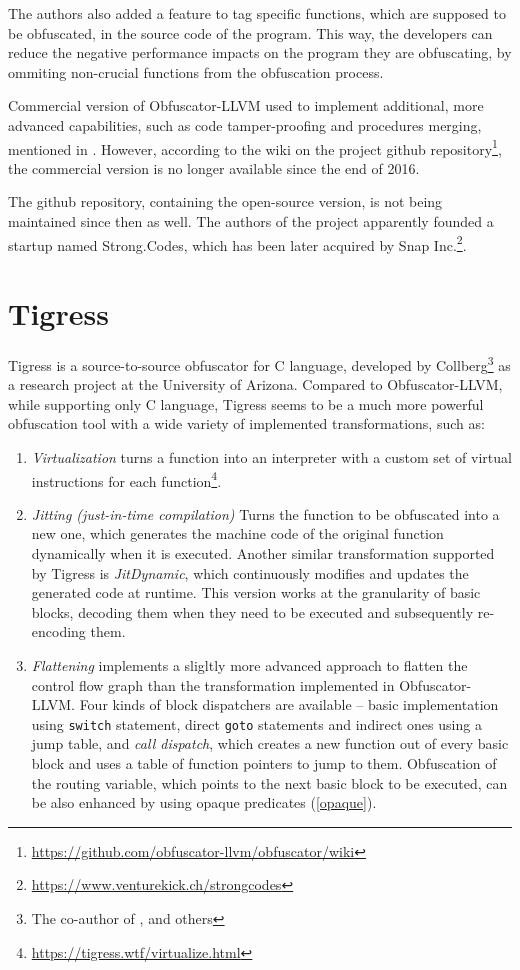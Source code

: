 \documentclass[
  digital, %
  table,   %
  twoside, %
  nolof,     %
  nolot,     %
]{fithesis3}
\theoremstyle{definition}
\begin{document}
The authors also added a feature to tag specific functions, which are supposed to be obfuscated, in the source code of the program. This way, the developers can reduce the negative performance impacts on the program they are obfuscating, by ommiting non-crucial functions from the obfuscation process. 

Commercial version of Obfuscator-LLVM used to implement additional, more advanced capabilities, such as code tamper-proofing and procedures merging, mentioned in \cite{obfuscator-llvm}. However, according to the wiki on the project github repository\footnote{\url{https://github.com/obfuscator-llvm/obfuscator/wiki}}, the commercial version is no longer available since the end of 2016. 

The github repository, containing the open-source version, is not being maintained since then as well. The authors of the project apparently founded a startup named Strong.Codes, which has been later acquired by Snap Inc.\footnote{\url{https://www.venturekick.ch/strongcodes}}.

\section{Tigress}

Tigress is a source-to-source obfuscator for C language, developed by Collberg\footnote{The co-author of \cite{taxonomy_obf}, \cite{manufacturing_opaque} and others} as a research project at the University of Arizona. Compared to Obfuscator-LLVM, while supporting only C language, Tigress seems to be a much more powerful obfuscation tool with a wide variety of implemented transformations, such as:
\begin{enumerate}
    \item \textit{Virtualization} turns a function into an interpreter with a custom set of virtual instructions for each function\footnote{\url{https://tigress.wtf/virtualize.html}}.
    \item \textit{Jitting (just-in-time compilation)} Turns the function to be obfuscated into a new one, which generates the machine code of the original function dynamically when it is executed. Another similar transformation supported by Tigress is \textit{JitDynamic}, which continuously modifies and updates the generated code at runtime. This version works at the granularity of basic blocks, decoding them when they need to be executed and subsequently re-encoding them.
    \item \textit{Flattening} implements a sligltly more advanced approach to flatten the control flow graph than the transformation implemented in Obfuscator-LLVM. Four kinds of block dispatchers are available -- basic implementation using \texttt{switch} statement, direct \texttt{goto} statements and indirect ones using a jump table, and \textit{call dispatch}, which creates a new function out of every basic block and uses a table of function pointers to jump to them. Obfuscation of the routing variable, which points to the next basic block to be executed, can be also enhanced by using opaque predicates (\ref{opaque}).
    
\end{enumerate}
\end{document}
